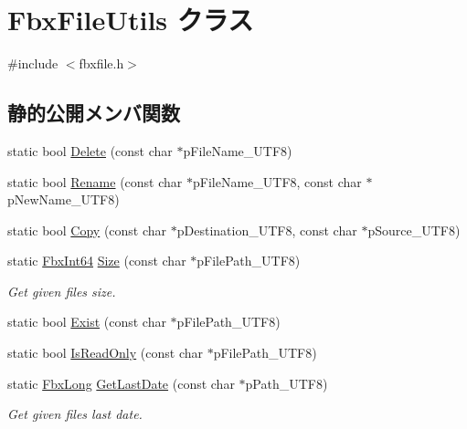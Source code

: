 \hypertarget{class_fbx_file_utils}{}\section{Fbx\+File\+Utils クラス}
\label{class_fbx_file_utils}


{\ttfamily \#include $<$fbxfile.\+h$>$}

\subsection*{静的公開メンバ関数}
\begin{DoxyCompactItemize}
\item 
static bool \hyperlink{class_fbx_file_utils_adfd2d189a647cb9c90b8773868e6f36e}{Delete} (const char $\ast$p\+File\+Name\+\_\+\+U\+T\+F8)
\item 
static bool \hyperlink{class_fbx_file_utils_a8fd66e9784dc281e1aabcf43e4f9949f}{Rename} (const char $\ast$p\+File\+Name\+\_\+\+U\+T\+F8, const char $\ast$p\+New\+Name\+\_\+\+U\+T\+F8)
\item 
static bool \hyperlink{class_fbx_file_utils_aeb9e95e483ce2430c54669c507fa2e21}{Copy} (const char $\ast$p\+Destination\+\_\+\+U\+T\+F8, const char $\ast$p\+Source\+\_\+\+U\+T\+F8)
\item 
static \hyperlink{fbxtypes_8h_ac7e1334c7c6aacc9c8a9dccddebb4368}{Fbx\+Int64} \hyperlink{class_fbx_file_utils_af146d0591ec4ec528b489b8b4cf60db2}{Size} (const char $\ast$p\+File\+Path\+\_\+\+U\+T\+F8)
\begin{DoxyCompactList}\small\item\em Get given file\textquotesingle{}s size. \end{DoxyCompactList}\item 
static bool \hyperlink{class_fbx_file_utils_afd22767320467beb7ba9488c15376ddc}{Exist} (const char $\ast$p\+File\+Path\+\_\+\+U\+T\+F8)
\item 
static bool \hyperlink{class_fbx_file_utils_aff7b1ae8ad2194a38cab29bab5c1b6e8}{Is\+Read\+Only} (const char $\ast$p\+File\+Path\+\_\+\+U\+T\+F8)
\item 
static \hyperlink{fbxtypes_8h_a70c7780f9a9ff5b9b08ab757b34e0726}{Fbx\+Long} \hyperlink{class_fbx_file_utils_a6ca177e6e95149aba60cea6492396fc8}{Get\+Last\+Date} (const char $\ast$p\+Path\+\_\+\+U\+T\+F8)
\begin{DoxyCompactList}\small\item\em Get given file\textquotesingle{}s last date. \end{DoxyCompactList}\item 

\end{DoxyCompactItemize}
